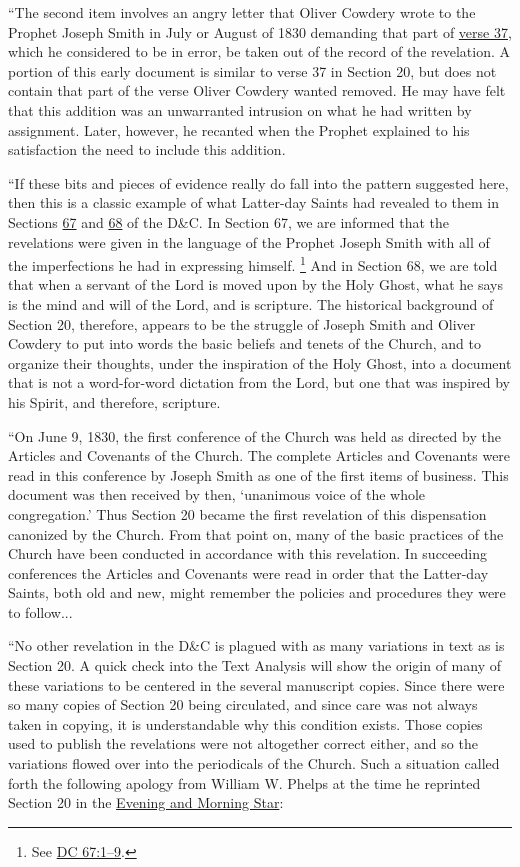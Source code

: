 			``The second item involves an angry letter that Oliver Cowdery wrote to the Prophet Joseph Smith in July or August of 1830 demanding that part of \hyperref[DC20-37]{verse 37}, which he considered to be in error, be taken out of the record of the revelation. A portion of this early document is similar to verse 37 in Section 20, but does not contain that part of the verse Oliver Cowdery wanted removed. He may have felt that this addition was an unwarranted intrusion on what he had written by assignment. Later, however, he recanted when the Prophet explained to his satisfaction the need to include this addition.
			
			``If these bits and pieces of evidence really do fall into the pattern suggested here, then this is a classic example of what Latter-day Saints had revealed to them in Sections \hyperref[DC67]{67} and \hyperref[DC68]{68} of the D\&C. In Section 67, we are informed that the revelations were given in the language of the Prophet Joseph Smith with all of the imperfections he had in expressing himself.%
				\footnote{%
					See \hyperref[DC67-1]{DC 67:1--9}.
					}
			And in Section 68, we are told that when a servant of the Lord is moved upon by the Holy Ghost, what he says is the mind and will of the Lord, and is scripture. The historical background of Section 20, therefore, appears to be the struggle of Joseph Smith and Oliver Cowdery to put into words the basic beliefs and tenets of the Church, and to organize their thoughts, under the inspiration of the Holy Ghost, into a document that is not a word-for-word dictation from the Lord, but one that was inspired by his Spirit, and therefore, scripture.
			
			``On June 9, 1830, the first conference of the Church was held as directed by the Articles and Covenants of the Church. The complete Articles and Covenants were read in this conference by Joseph Smith as one of the first items of business. This document was then received by then, `unanimous voice of the whole congregation.' Thus Section 20 became the first revelation of this dispensation canonized by the Church. From that point on, many of the basic practices of the Church have been conducted in accordance with this revelation. In succeeding conferences the Articles and Covenants were read in order that the Latter-day Saints, both old and new, might remember the policies and procedures they were to follow...
			
			``No other revelation in the D\&C is plagued with as many variations in text as is Section 20. A quick check into the Text Analysis will show the origin of many of these variations to be centered in the several manuscript copies. Since there were so many copies of Section 20 being circulated, and since care was not always taken in copying, it is understandable why this condition exists. Those copies used to publish the revelations were not altogether correct either, and so the variations flowed over into the periodicals of the Church. Such a situation called forth the following apology from William W. Phelps at the time he reprinted Section 20 in the \uline{Evening and Morning Star}:
			
